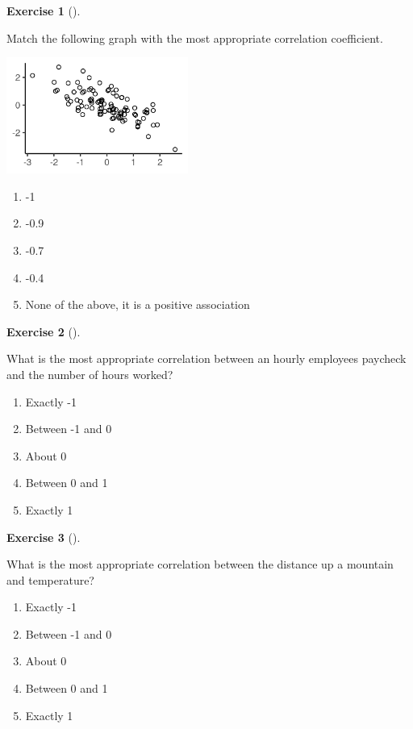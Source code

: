 \documentclass[
  letterpaper,
  DIV=11,
  numbers=noendperiod]{scrreprt}
\providecommand{\tightlist}{%
  \setlength{\itemsep}{0pt}\setlength{\parskip}{0pt}}\usepackage{longtable,booktabs,array}
\theoremstyle{definition}
\newtheorem{exercise}{Exercise}[chapter]
\theoremstyle{remark}
\begin{document}
\begin{exercise}[]\protect\hypertarget{exr-ch05-c01}{}\label{exr-ch05-c01}

Match the following graph with the most appropriate correlation
coefficient.

\includegraphics[width=\textwidth,height=1.5in]{images/cor_-0.7.png}

\begin{enumerate}
\def\labelenumi{\alph{enumi})}
\tightlist
\item
  -1
\item
  -0.9
\item
  -0.7
\item
  -0.4
\item
  None of the above, it is a positive association
\end{enumerate}

\end{exercise}

\begin{exercise}[]\protect\hypertarget{exr-ch05-c02}{}\label{exr-ch05-c02}

What is the most appropriate correlation between an hourly employees
paycheck and the number of hours worked?

\begin{enumerate}
\def\labelenumi{\alph{enumi})}
\tightlist
\item
  Exactly -1
\item
  Between -1 and 0
\item
  About 0
\item
  Between 0 and 1
\item
  Exactly 1
\end{enumerate}

\end{exercise}

\begin{exercise}[]\protect\hypertarget{exr-ch05-c03}{}\label{exr-ch05-c03}

What is the most appropriate correlation between the distance up a
mountain and temperature?

\begin{enumerate}
\def\labelenumi{\alph{enumi})}
\tightlist
\item
  Exactly -1
\item
  Between -1 and 0
\item
  About 0
\item
  Between 0 and 1
\item
  Exactly 1
\end{enumerate}

\end{exercise}
\end{document}

